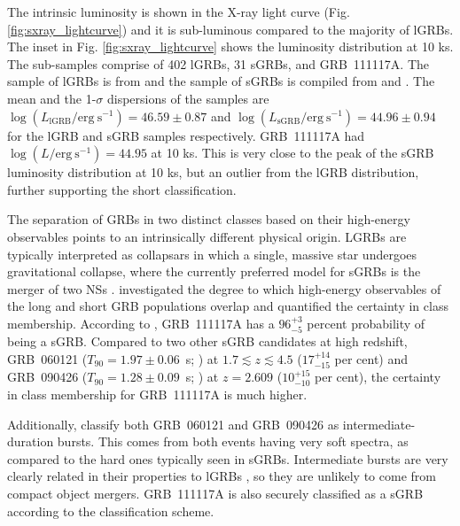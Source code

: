 \documentclass[referee]{aa}
\begin{document}
The intrinsic luminosity is shown in the X-ray light curve (Fig.
\ref{fig:sxray_lightcurve}) and it is sub-luminous compared to the majority of
lGRBs. The inset in Fig. \ref{fig:sxray_lightcurve} shows the luminosity
distribution at 10 ks. The sub-samples comprise of 402 lGRBs, 31 sGRBs, and
GRB~111117A. The sample of lGRBs is from \citet{Evans2007, Evans2009} and the
sample of sGRBs is compiled from \citet{Kann2011, Berger2014} and
\citet{DAvanzo2014a}. The mean and the 1-$\sigma$ dispersions of the samples are
$\log(L_{\mathrm{lGRB}} / \mathrm{erg~s}^{-1}) = 46.59 \pm 0.87$ and
$\log(L_{\mathrm{sGRB}} / \mathrm{erg~s}^{-1})  = 44.96 \pm 0.94$ for the lGRB
and sGRB samples respectively. GRB~111117A had $\log(L / \mathrm{erg~s}^{-1}) =
44.95$ at 10 ks. This is very close to the peak of the sGRB luminosity
distribution at 10 ks, but an outlier from the lGRB distribution, further
supporting the short classification.

The separation of GRBs in two distinct classes based on their high-energy
observables points to an intrinsically different physical origin. LGRBs are
typically interpreted as collapsars \citep{MacFadyen1999} in which a single, massive
star undergoes gravitational collapse, where the currently preferred model for
sGRBs is the merger of two NSs \citep{Eichler1989, Nakar2007}.
\citet{Bromberg2013} investigated the degree to which high-energy observables of
the long and short GRB populations overlap and quantified the certainty in class
membership. According to \citet{Bromberg2013}, GRB~111117A has a $96_{-5}^{+3}$
percent probability of being a sGRB. Compared to two other sGRB candidates
at high redshift, GRB~060121 ($T_{90}=1.97 \pm 0.06$~s;
\citealt{DeUgartePostigo2006, Levan2006}) at $1.7 \lesssim z \lesssim 4.5$
($17_{-15}^{+14}$ per cent) and GRB~090426 ($T_{90}=1.28 \pm 0.09$~s;
\citealt{Antonelli2009, Levesque2010, Thone2011}) at $z = 2.609$ ($10_{-10}^{+15}$
per cent), the certainty in class membership for GRB~111117A is much higher.

Additionally, \citet{Horvath2010} classify both GRB~060121 and GRB~090426 as
intermediate-duration bursts. This comes from both events having very soft
spectra, as compared to the hard ones typically seen in sGRBs. Intermediate
bursts are very clearly related in their properties to lGRBs
\citep{DeUgartePostigo2011}, so they are unlikely to come from compact object
mergers. GRB~111117A is also securely classified as a sGRB according to the
\citet{Horvath2010} classification scheme.
\end{document}
